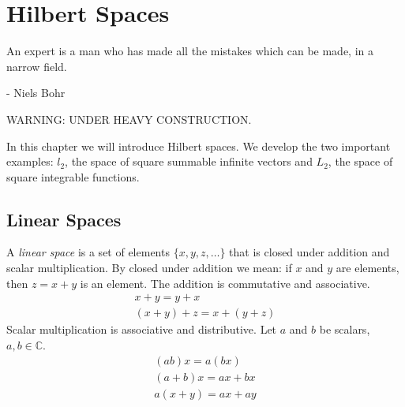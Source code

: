 \flushbottom





\chapter{Hilbert Spaces}





An expert is a man who has made all the mistakes which can be made, 
in a narrow field.

\begin{flushright}
  - Niels Bohr
\end{flushright}










WARNING: UNDER HEAVY CONSTRUCTION.

In this chapter we will introduce Hilbert spaces.  We develop the two 
important examples: $l_2$, the space of square summable infinite vectors 
and $L_2$, the space of square integrable functions.







\section{Linear Spaces}


A \textit{linear space} is a set of elements $\{x, y, z, \ldots\}$
that is closed under addition and scalar multiplication.  By closed under 
addition we mean: if $x$ and $y$ are elements, then $z = x + y$ is an element.
The addition is commutative and associative.
\begin{gather*}
  x + y = y + x \\
  (x + y) + z = x + (y + z)
\end{gather*}
Scalar multiplication is associative and distributive.
Let $a$ and $b$ be scalars, $a,b \in \mathbb{C}$.
\begin{gather*}
  (a b) x = a (b x) \\
  (a + b) x = a x + b x \\
  a(x + y) = a x + a y
\end{gather*}

